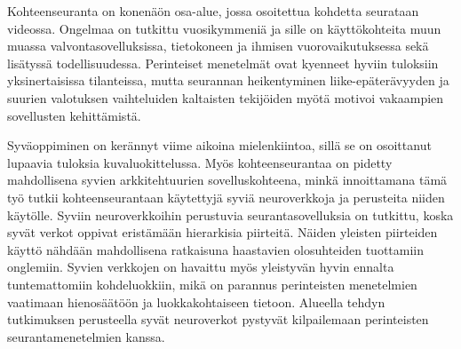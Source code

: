 \begin{abstractpage}[finnish]
Kohteenseuranta on konenäön osa-alue, jossa osoitettua kohdetta seurataan videossa. Ongelmaa on tutkittu vuosikymmeniä ja sille on käyttökohteita muun muassa valvontasovelluksissa, tietokoneen ja ihmisen vuorovaikutuksessa sekä lisätyssä todellisuudessa. Perinteiset menetelmät ovat kyenneet hyviin tuloksiin yksinertaisissa tilanteissa, mutta seurannan heikentyminen liike-epäterävyyden ja suurien valotuksen vaihteluiden kaltaisten tekijöiden myötä motivoi vakaampien sovellusten kehittämistä.

Syväoppiminen on kerännyt viime aikoina mielenkiintoa, sillä se on osoittanut lupaavia tuloksia kuvaluokittelussa. Myös kohteenseurantaa on pidetty mahdollisena syvien arkkitehtuurien sovelluskohteena, minkä innoittamana tämä työ tutkii kohteenseurantaan käytettyjä syviä neuroverkkoja ja perusteita niiden käytölle. Syviin neuroverkkoihin perustuvia seurantasovelluksia on tutkittu, koska syvät verkot oppivat eristämään hierarkisia piirteitä. Näiden yleisten piirteiden käyttö nähdään mahdollisena ratkaisuna haastavien olosuhteiden tuottamiin onglemiin. Syvien verkkojen on havaittu myös yleistyvän hyvin ennalta tuntemattomiin kohdeluokkiin, mikä on parannus perinteisten menetelmien vaatimaan hienosäätöön ja luokkakohtaiseen tietoon. Alueella tehdyn tutkimuksen perusteella syvät neuroverkot pystyvät kilpailemaan perinteisten seurantamenetelmien kanssa.
\end{abstractpage}
